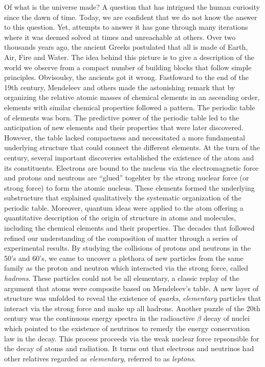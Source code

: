 

Of what is the universe made? A question that has intrigued the human curiosity since the dawn of time. 
Today, we are confident that we do not know the answer to this question. 
Yet, attempts to answer it has gone through many iterations where it was deemed solved at times 
and unreachable at others. 
Over two thousands years ago, the ancient Greeks  postulated that all is made of Earth, Air, Fire and Water. 
The idea behind this picture is to give a description of the world we observe from a compact number of building blocks
that follow simple principles. Obvisoulsy, the ancients got it wrong.
Fastfoward to the end of the 19th century, Mendeleev and others made the astonishing remark that by organizing the 
relative atomic masses of chemical elements in an ascending order, elements with similar chemical properties followed a pattern.
The periodic table of elements was born. 
The predictive power of the periodic table led to the anticipation of new elements and their properties that were later discovered.
However, the table lacked compactness and necessitated a more fundamental underlying structure that could 
connect the different elements. At the turn of the century, several important discoveries established 
the existence of the atom and its constituents. Electrons are bound to the nucleus via the electromagnetic force and 
protons and neutrons are ``glued'' togehter by the strong nuclear force (or strong force) to form the atomic nucleus.
These elements formed the underlying substructure that explained qualitatively the systematic organization of the periodic table.
Moreover, quantum ideas were applied to the atom offering a quantitative description of the origin of structure in atoms and molecules, 
including the chemical elements and their properties.
The decades that followed refined our understanding of the composition of matter through a series of experimental results.
By studying the collisions of protons and neutrons in the 50's and 60's, we came to uncover a plethora of new particles from the same 
family as the proton and neutron which interacted via the strong force, called \textit{hadrons}.
These particles could not be all elementary, a classic replay of the argument that atoms were composite based on Mendeleev's table.
A new layer of structure was unfolded to reveal the existence of \textit{quarks}, \textit{elementary} 
particles that interact via the strong force and make up all hadrons. 
Another puzzle of the 20th century was the continuous energy spectra in the radioactive $\beta$ decay of nuclei which pointed to the 
existence of neutrinos to remedy the energy conservation law in the decay. This process proceeds via the weak nuclear force 
repsonsible for the decay of atoms and radiation.
It turns out that electrons and neutrinos had other relatives regarded as \textit{elementary}, referred to as \textit{leptons}.


